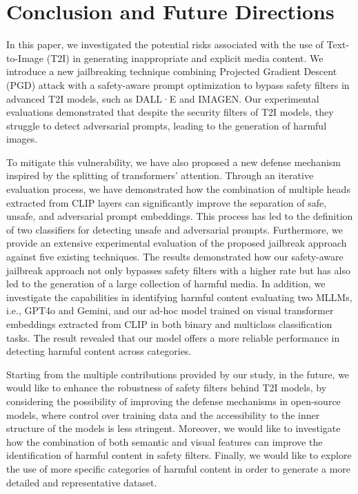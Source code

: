 \documentclass[acmsmall]{acmart}
\newcommand{\dalle}{DALL·E\xspace}
\newcommand{\imagen}{IMAGEN\xspace}
\begin{document}
{\section{Conclusion and Future Directions}\label{sec:Conclusion}
In this paper, we investigated the potential risks associated with the use of Text-to-Image (T2I) in generating inappropriate and explicit media content. We introduce a new jailbreaking technique combining Projected Gradient Descent (PGD) attack with a safety-aware prompt optimization to bypass safety filters in advanced T2I models, such as \dalle and \imagen. Our experimental evaluations demonstrated that despite the security filters of T2I models, they struggle to detect adversarial prompts, leading to the generation of harmful images. 

To mitigate this vulnerability, we have also proposed a new defense mechanism inspired by the splitting of transformers' attention. Through an iterative evaluation process, we have demonstrated how the combination of multiple heads extracted from CLIP layers can significantly improve the separation of safe, unsafe, and adversarial prompt embeddings. This process has led to the definition of two classifiers for detecting unsafe and adversarial prompts. Furthermore, we provide an extensive experimental evaluation of the proposed jailbreak approach against five existing techniques. The results demonstrated how our safety-aware jailbreak approach not only bypasses safety filters with a higher rate but has also led to the generation of a large collection of harmful media. In addition, we investigate the capabilities in identifying harmful content evaluating two MLLMs, i.e., GPT4o and Gemini, and our ad-hoc model trained on visual transformer embeddings extracted from CLIP in both binary and multiclass classification tasks. The result revealed that our model offers a more reliable performance in detecting harmful content across categories.



Starting from the multiple contributions provided by our study, in the future, we would like to enhance the robustness of safety filters behind T2I models, by considering the possibility of improving the defense mechanisms in open-source models, where control over training data and the accessibility to the inner structure of the models is less stringent. 
Moreover, we would like to investigate how the combination of both semantic and visual features can improve the identification of harmful content in safety filters. 
Finally, we would like to explore the use of more specific categories of harmful content in order to generate a more detailed and representative dataset.

}
\end{document}

